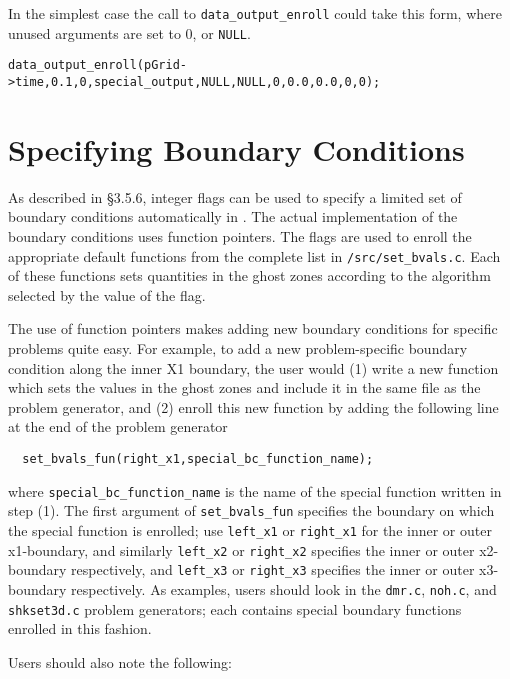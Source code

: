 In the simplest case the call to {\tt data\_output\_enroll} could take 
this form, where unused arguments are set to 0, or {\tt NULL}.
\begin{verbatim}
data_output_enroll(pGrid->time,0.1,0,special_output,NULL,NULL,0,0.0,0.0,0,0);
\end{verbatim}

\section{Specifying Boundary Conditions}

As described in \S 3.5.6, integer flags can be used to specify a limited set
of boundary conditions automatically in \ath.  The actual implementation of
the boundary conditions uses function pointers.  The
flags are used to enroll the appropriate default 
functions from the complete list in {\tt /src/set\_bvals.c}.  Each of these
functions sets quantities in the ghost zones according to the 
algorithm selected by the value of the flag.

The use of function pointers makes adding new boundary conditions for
specific problems quite easy.  For example, to add a new problem-specific
boundary condition along the inner X1 boundary, the user would (1)
write a new function which sets the values in the ghost zones and include
it in the
same file as the problem generator, and (2) enroll this new function by
adding the following line at the end of the problem generator
\begin{verbatim}
  set_bvals_fun(right_x1,special_bc_function_name);
\end{verbatim}

\noindent
where {\tt special\_bc\_function\_name} is the name of the special
function written in step (1).  The first argument of {\tt set\_bvals\_fun}
specifies the boundary on which the special function is enrolled; use
{\tt left\_x1} or {\tt right\_x1} for the inner or outer x1-boundary,
and similarly {\tt left\_x2} or {\tt right\_x2} specifies the inner or
outer x2-boundary respectively, and {\tt left\_x3} or {\tt right\_x3}
specifies the inner or outer x3-boundary respectively.  As examples,
users should look in the {\tt dmr.c}, {\tt noh.c}, and {\tt shkset3d.c}
problem generators; each contains special boundary functions enrolled
in this fashion.

Users should also note the following:

